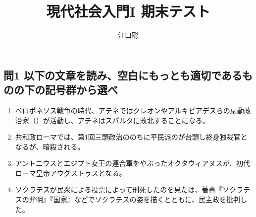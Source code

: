 \documentclass[uplatex,dvipdfmx]{jsarticle}
\author{江口聡}
\title{現代社会入門I 期末テスト}
\begin{document}
\maketitle

\subsection*{問1 以下の文章を読み、空白にもっとも適切であるものの下の記号群から選べ }

\begin{enumerate}




  


  



  
\item ペロポネソス戦争の時代、アテネではクレオンやアルキビアデスらの扇動政治家（）が活動し、アテネはスパルタに敗北することになる。
  


  
\item 共和政ローマでは、第1回三頭政治ののちに平民派のが台頭し終身独裁官となるが、暗殺される。

  
 \item アントニウスとエジプト女王の連合軍をやぶったオクタウィアヌスが、初代ローマ皇帝アウグストゥスとなる。
  

  
\item ソクラテスが民衆による投票によって刑死したのを見たは、著書『ソクラテスの弁明』『国家』などでソクラテスの姿を描くとともに、民主政を批判した。
  


\end{enumerate}
\end{document}
